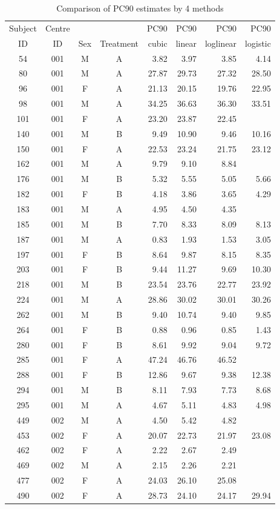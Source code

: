 \begin{table}
\centering
\caption{Comparison of PC90 estimates by 4 methods}\label{PC90}
\begin{tabular}{|cccc|rrrr|}
\hline
Subject&Centre&&&PC90&PC90&PC90&PC90\\
ID&ID&Sex&Treatment&cubic&linear&loglinear&logistic\\
\hline
54&001&M&A&3.82&3.97&3.85&4.14\\
80&001&M&A&27.87&29.73&27.32&28.50\\
96&001&F&A&21.13&20.15&19.76&22.95\\
98&001&M&A&34.25&36.63&36.30&33.51\\
101&001&F&A&23.20&23.87&22.45&\\
140&001&M&B&9.49&10.90&9.46&10.16\\
150&001&F&A&22.53&23.24&21.75&23.12\\
162&001&M&A&9.79&9.10&8.84&\\
176&001&M&B&5.32&5.55&5.05&5.66\\
182&001&F&B&4.18&3.86&3.65&4.29\\
183&001&M&A&4.95&4.50&4.35&\\
185&001&M&B&7.70&8.33&8.09&8.13\\
187&001&M&A&0.83&1.93&1.53&3.05\\
197&001&F&B&8.64&9.87&8.15&8.35\\
203&001&F&B&9.44&11.27&9.69&10.30\\
218&001&M&B&23.54&23.76&22.77&23.92\\
224&001&M&A&28.86&30.02&30.01&30.26\\
262&001&M&B&9.40&10.74&9.40&9.85\\
264&001&F&B&0.88&0.96&0.85&1.43\\
280&001&F&B&8.61&9.92&9.04&9.72\\
285&001&F&A&47.24&46.76&46.52&\\
288&001&F&B&12.86&9.67&9.38&12.38\\
294&001&M&B&8.11&7.93&7.73&8.68\\
295&001&M&A&4.67&5.11&4.83&4.98\\
449&002&M&A&4.50&5.42&4.82&\\
453&002&F&A&20.07&22.73&21.97&23.08\\
462&002&F&A&2.22&2.67&2.49&\\
469&002&M&A&2.15&2.26&2.21&\\
477&002&F&A&24.03&26.10&25.08&\\
490&002&F&A&28.73&24.10&24.17&29.94\\

\end{tabular}
\end{table}

